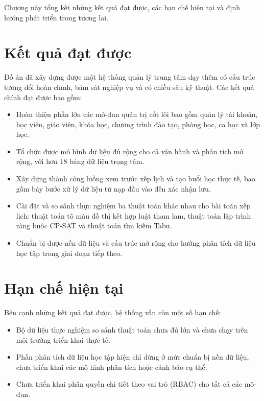 \documentclass[../DoAn.tex]{subfiles}
\begin{document}
Chương này tổng kết những kết quả đạt được, các hạn chế hiện tại và định hướng phát triển trong tương lai.

\section{Kết quả đạt được}
\label{section:6.1}
Đồ án đã xây dựng được một hệ thống quản lý trung tâm dạy thêm có cấu trúc tương đối hoàn chỉnh, bám sát nghiệp vụ và có chiều sâu kỹ thuật. Các kết quả chính đạt được bao gồm:

\begin{itemize}
    \item Hoàn thiện phần lớn các mô-đun quản trị cốt lõi bao gồm quản lý tài khoản, học viên, giáo viên, khóa học, chương trình đào tạo, phòng học, ca học và lớp học.
    \item Tổ chức được mô hình dữ liệu đủ rộng cho cả vận hành và phân tích mở rộng, với hơn 18 bảng dữ liệu trọng tâm.
    \item Xây dựng thành công luồng xem trước xếp lịch và tạo buổi học thực tế, bao gồm bảy bước xử lý dữ liệu từ nạp đầu vào đến xác nhận lưu.
    \item Cài đặt và so sánh thực nghiệm ba thuật toán khác nhau cho bài toán xếp lịch: thuật toán tô màu đồ thị kết hợp luật tham lam, thuật toán lập trình ràng buộc CP-SAT và thuật toán tìm kiếm Tabu.
    \item Chuẩn bị được nền dữ liệu và cấu trúc mở rộng cho hướng phân tích dữ liệu học tập trong giai đoạn tiếp theo.
\end{itemize}

\section{Hạn chế hiện tại}
\label{section:6.2}
Bên cạnh những kết quả đạt được, hệ thống vẫn còn một số hạn chế:

\begin{itemize}
    \item Bộ dữ liệu thực nghiệm so sánh thuật toán chưa đủ lớn và chưa chạy trên môi trường triển khai thực tế.
    \item Phần phân tích dữ liệu học tập hiện chỉ dừng ở mức chuẩn bị nền dữ liệu, chưa triển khai các mô hình phân tích hoặc cảnh báo cụ thể.
    \item Chưa triển khai phân quyền chi tiết theo vai trò (RBAC) cho tất cả các mô-đun.
\end{itemize}
\end{document}
